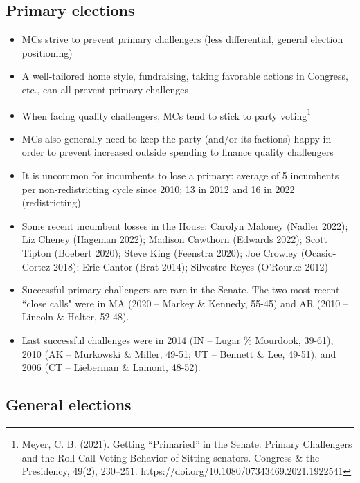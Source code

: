 \documentclass[10pt]{article}
\begin{document}
\subsection{Primary elections}

\begin{itemize}
    \item MCs strive to prevent primary challengers (less differential, general election positioning)
    \item A well-tailored home style, fundraising, taking favorable actions in Congress, etc., can all prevent primary challenges
    \item When facing quality challengers, MCs tend to stick to party voting\footnote{Meyer, C. B. (2021). Getting ``Primaried” in the Senate: Primary Challengers and the Roll-Call Voting Behavior of Sitting senators. Congress \& the Presidency, 49(2), 230–251. https://doi.org/10.1080/07343469.2021.1922541}
    \item MCs also generally need to keep the party (and/or its factions) happy in order to prevent increased outside spending to finance quality challengers
    \item It is uncommon for incumbents to lose a primary: average of 5 incumbents per non-redistricting cycle since 2010; 13 in 2012 and 16 in 2022 (redistricting)
    \item Some recent incumbent losses in the House: Carolyn Maloney (Nadler 2022); Liz Cheney (Hageman 2022); Madison Cawthorn (Edwards 2022); Scott Tipton (Boebert 2020); Steve King (Feenstra 2020); Joe Crowley (Ocasio-Cortez 2018); Eric Cantor (Brat 2014); Silvestre Reyes (O'Rourke 2012)
    \item Successful primary challengers are rare in the Senate. The two most recent ``close calls" were in MA (2020 -- Markey \& Kennedy, 55-45) and AR (2010 -- Lincoln \& Halter, 52-48). 
    \item Last successful challenges were in 2014 (IN -- Lugar \% Mourdook, 39-61), 2010 (AK -- Murkowski \& Miller, 49-51; UT -- Bennett \& Lee, 49-51), and 2006 (CT -- Lieberman \& Lamont, 48-52).
\end{itemize}

\subsection{General elections}
\end{document}
